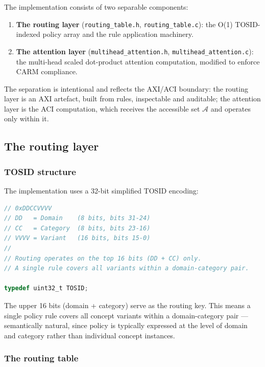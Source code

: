 \documentclass[11pt,a4paper]{article}
\theoremstyle{definition}
\begin{document}
The implementation consists of two separable components:

\begin{enumerate}[label=\arabic*.]
  \item \textbf{The routing layer} (\texttt{routing\_table.h},
        \texttt{routing\_table.c}): the O(1) TOSID-indexed policy array and
        the rule application machinery.
  \item \textbf{The attention layer} (\texttt{multihead\_attention.h},
        \texttt{multihead\_attention.c}): the multi-head scaled dot-product
        attention computation, modified to enforce CARM compliance.
\end{enumerate}

The separation is intentional and reflects the AXI/ACI boundary: the routing
layer is an AXI artefact, built from rules, inspectable and auditable; the
attention layer is the ACI computation, which receives the accessible set
$\mathcal{A}$ and operates only within it.

\subsection{The routing layer}
\label{sec:routinglayer}

\subsubsection{TOSID structure}

The implementation uses a 32-bit simplified TOSID encoding:

\begin{lstlisting}[language=C, caption={TOSID bit layout (32-bit simplified form).},
                   label=lst:tosid]
// 0xDDCCVVVV
// DD   = Domain    (8 bits, bits 31-24)
// CC   = Category  (8 bits, bits 23-16)
// VVVV = Variant   (16 bits, bits 15-0)
//
// Routing operates on the top 16 bits (DD + CC) only.
// A single rule covers all variants within a domain-category pair.

typedef uint32_t TOSID;
\end{lstlisting}

The upper 16 bits (domain + category) serve as the routing key. This means a
single policy rule covers all concept variants within a domain-category pair
--- semantically natural, since policy is typically expressed at the level of
domain and category rather than individual concept instances.

\subsubsection{The routing table}
\end{document}
